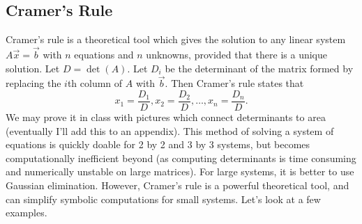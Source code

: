 \subsection{Cramer's Rule}
Cramer's rule is a theoretical tool which gives the solution to any linear system $A\vec x = \vec b$ with $n$ equations and $n$ unknowns, provided that there is a unique solution.  
Let $D=\det(A)$. 
Let $D_i$ be the determinant of the matrix formed by replacing the $i$th column of $A$ with $\vec b$.  
Then Cramer's rule states that $$x_1 = \frac{D_1}{D},x_2 = \frac{D_2}{D},\ldots, x_n = \frac{D_n}{D}.$$ 
We may prove it in class with pictures which connect determinants to area (eventually I'll add this to an appendix). 
This method of solving a system of equations is quickly doable for 2 by 2 and 3 by 3 systems, but becomes computationally inefficient beyond (as computing determinants is time consuming and numerically unstable on large matrices). 
For large systems, it is better to use Gaussian elimination. 
However, Cramer's rule is a powerful theoretical tool, and can simplify symbolic computations for small systems. Let's look at a few examples.

